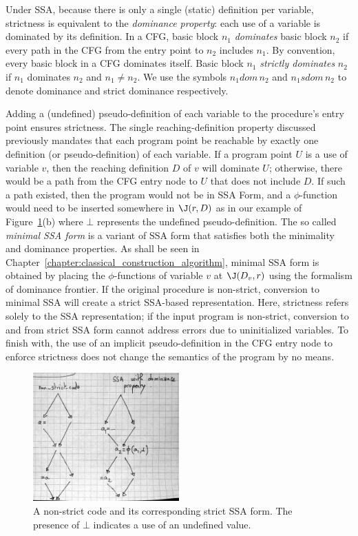 Under SSA, because there is only a single
(static) definition per variable, strictness is equivalent to the
\emph{dominance property}: each use of a variable is dominated by
its definition.
In a CFG, basic block $n_{1}$ \emph{dominates} basic block $n_{2}$
if every path in the CFG from the entry point to $n_{2}$ includes
$n_{1}$. By convention, every basic block in a CFG dominates itself. Basic 
block $n_{1}$ \emph{strictly dominates} $n_{2}$ if $n_{1}$ dominates
$n_{2}$ and $n_{1} \neq n_{2}$. We use the symbols $n_{1} dom\, n_{2}$
and $n_{1} sdom\, n_{2}$ to denote dominance and strict dominance 
respectively.


Adding a (undefined) pseudo-definition of each variable to the procedure's entry
point ensures strictness. 
The single reaching-definition property discussed previously mandates that each
program point be reachable by exactly one definition (or pseudo-definition)
of each variable. If a program point $U$ is a use of variable $v$, then the
reaching definition $D$ of $v$ will dominate $U$; otherwise, there would be a path
from the CFG entry node to $U$ that does not include $D$. If such a  path existed, then the program would not be in SSA Form, and a $\phi$-function would need to be inserted somewhere
in $\J(r,D)$ as in our example of Figure~\ref{fig:properties_and_flavors:dom_property}(b) where $\bot$ represents the undefined pseudo-definition. The so called \emph{minimal SSA form} is a variant of SSA form that satisfies both the minimality and dominance properties. As shall be seen in Chapter~\ref{chapter:classical_construction_algorithm}, minimal SSA form is obtained by placing the $\phi$-functions of variable $v$ at $\J(D_v,r)$ using the formalism of dominance frontier.
If the original procedure is non-strict, conversion to minimal SSA
will create a strict SSA-based representation. Here, strictness refers
solely to the SSA representation; if the input program is non-strict,
conversion to and from strict SSA form cannot address errors due
to uninitialized variables. To finish with, the use of an implicit pseudo-definition in the CFG entry node to enforce strictness does not change the semantics of the program by no means.


\begin{figure}
\includegraphics[width=0.5\textwidth]{dom_property.jpeg}
\caption{\label{fig:properties_and_flavors:dom_property}A non-strict code and its corresponding strict SSA form. The presence of $\bot$ indicates a use of an undefined value.}
\end{figure}


